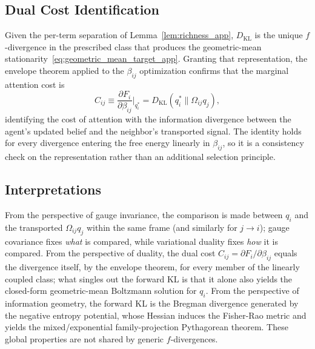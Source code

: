 \documentclass[11pt]{article}
\begin{document}
\subsection*{Dual Cost Identification}
Given the per-term separation of Lemma~\ref{lem:richness_app}, $D_{\mathrm{KL}}$ is the unique $f$-divergence in the prescribed class that produces the geometric-mean stationarity~\eqref{eq:geometric_mean_target_app}. Granting that representation, the envelope theorem applied to the $\beta_{ij}$ optimization confirms that the marginal attention cost is
\begin{equation}
C_{ij} \equiv \frac{\partial F_i}{\partial\beta_{ij}}\bigg|_{q_i^*}
= D_{\mathrm{KL}}(q_i^*\|\Omega_{ij}q_j),
\end{equation}
identifying the cost of attention with the information divergence between the agent's updated belief and the neighbor's transported signal. The identity holds for every divergence entering the free energy linearly in $\beta_{ij}$, so it is a consistency check on the representation rather than an additional selection principle.

\subsection*{Interpretations}
From the perspective of gauge invariance, the comparison is made between $q_i$ and the transported $\Omega_{ij}q_j$ within the same frame (and similarly for $j \rightarrow i$); gauge covariance fixes \emph{what} is compared, while variational duality fixes \emph{how} it is compared. From the perspective of duality, the dual cost $C_{ij} = \partial F_i/\partial\beta_{ij}$ equals the divergence itself, by the envelope theorem, for every member of the linearly coupled class; what singles out the forward KL is that it alone also yields the closed-form geometric-mean Boltzmann solution for $q_i$. From the perspective of information geometry, the forward KL is the Bregman divergence generated by the negative entropy potential, whose Hessian induces the Fisher-Rao metric and yields the mixed/exponential family-projection Pythagorean theorem. These global properties are not shared by generic $f$-divergences.
\end{document}
